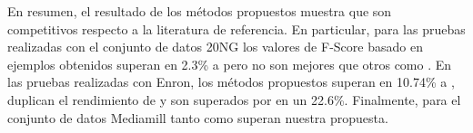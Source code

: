 En resumen, el resultado de los métodos propuestos muestra que son competitivos
respecto a la literatura de referencia. En particular, para las pruebas
realizadas con el conjunto de datos 20NG los valores de F-Score basado en
ejemplos obtenidos superan en 2.3\% a \cite{osojnik_multi-label_2017} pero no
son mejores que otros como \cite{sousa_multi-label_2018, buyukcakir_novel_2018,
	roseberry_multi-label_2018}.  En las pruebas realizadas con Enron, los métodos
propuestos superan en 10.74\% a \cite{osojnik_multi-label_2017}, duplican el
rendimiento de \cite{roseberry_multi-label_2018} y son superados por
\cite{sousa_multi-label_2018} en un 22.6\%. Finalmente, para el conjunto de
datos Mediamill tanto \cite{sousa_multi-label_2018} como
\cite{roseberry_multi-label_2018} superan nuestra propuesta.



